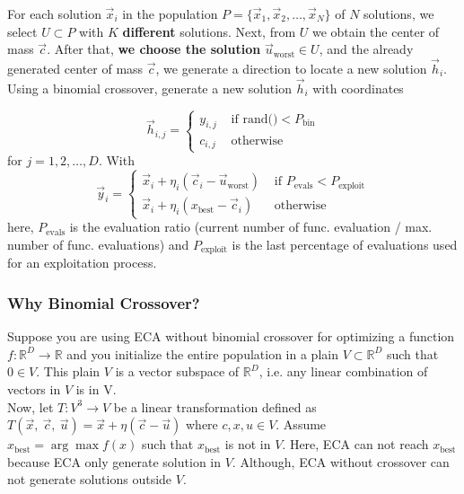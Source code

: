 \documentclass[12pt,letterpape]{article}
\begin{document}
For each solution $\vec{x}_i $ in the population 
$P = \{ \vec{x}_1, \vec{x}_2, \ldots, \vec{x}_{N} \} $ of $N$ 
solutions, we select $U \subset P $ with $K$ \textbf{different} solutions. Next, 
from $U$ we obtain the center of mass $\vec{c}$. After that, \textbf{we choose the solution}
$\vec{u}_{\text{worst}} \in U$, and the already generated center of mass $\vec{c}$,
we generate a direction to locate a new solution $ \vec{h}_i$. Using a binomial 
crossover, generate a new solution $\vec{h}_{i}$ with coordinates

%
\begin{equation}
	\vec{h}_{i,j} = 
	\begin{cases}
		y_{i,j} & \text{ if rand()} < P_{\text{bin}}\\
		c_{i,j} & \text{ otherwise}
	\end{cases}
	\label{eqn:newSol}
\end{equation}
% 
for $j = 1,2,\ldots,D$. With 
%
\begin{equation}
	\vec{y}_i = 
	\begin{cases}
		\vec{x}_i + \eta _{i} ( \vec{c}_i - \vec{u}_{ \text{worst} } ) 
		       & \text{ if } P_{\text{evals}} < P_{\text{exploit}} \\
		\vec{x}_i + \eta _{i} ( x_{\text{best}} - \vec{c}_i)
		       & \text{ otherwise}
	\end{cases}
	\label{eqn:vcu}
\end{equation}
%
here, $ P_{\text{evals}}$ is the evaluation ratio (current number of func. evaluation / max.
number of func. evaluations) and  $P_{\text{exploit}}$ is the last percentage of
evaluations used for an exploitation process.
%


\subsubsection{Why Binomial Crossover?} %
\label{sub:why_binomial_crossover_}

Suppose you are using ECA without binomial crossover for optimizing a function 
$f:\mathbb{R}^D \to \mathbb{R}$ and you initialize the entire population in a 
plain $V \subset \mathbb{R}^D $ such that $0 \in V$. This plain $V$ is a vector 
subspace of $\mathbb{R}^D$, i.e. any linear combination of vectors in $V$ is in V.\\

Now, let $T:V^3 \to V$ be a linear transformation defined as 
$ T(\vec{x},\ \vec{c},\ \vec{u}) = \vec{x} + \eta ( \vec{c} - \vec{u} )$ where 
$c,x,u \in V$. Assume $x_\text{best} = \arg \max f(x)$ such that $x_\text{best} $
is not in $V$. Here, ECA can not reach $x_\text{best}$ because ECA only generate
solution in $V$. Although, ECA without crossover can not generate solutions outside $V$.
\end{document}
